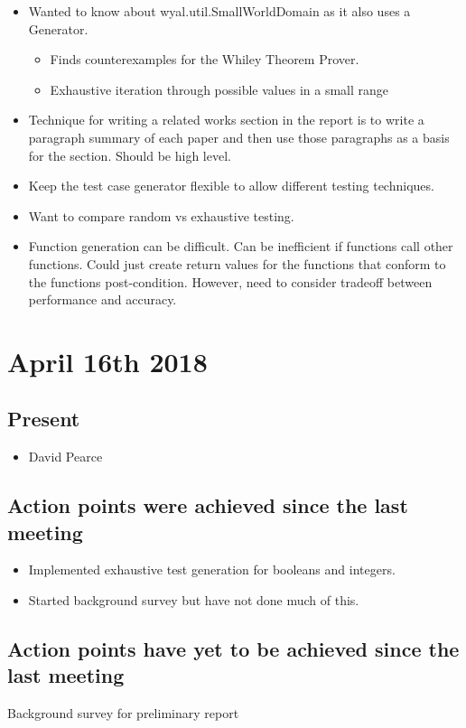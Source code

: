 \documentclass[]{article}
\begin{document}
\begin{itemize}

	\item Wanted to know about wyal.util.SmallWorldDomain as it also uses a Generator.
		\begin{itemize}
			\item Finds counterexamples for the Whiley Theorem Prover.
			\item Exhaustive iteration through possible values in a small range
		\end{itemize}
	\item Technique for writing a related works section in the report is to write a paragraph summary of each paper and then use those paragraphs as a basis for the section. Should be high level.
	\item Keep the test case generator flexible to allow different testing techniques.
	\item Want to compare random vs exhaustive testing.
	\item Function generation can be difficult. Can be inefficient if functions call other functions. Could just create return values for the functions that conform to the functions post-condition. However, need to consider tradeoff between performance and accuracy.
\end{itemize}

\section{April 16th 2018}
\subsection{Present}
\begin{itemize}
	\item David Pearce
\end{itemize}

\subsection{Action points were achieved since the last meeting}
	\begin{itemize}
		\item Implemented exhaustive test generation for booleans and integers.
		\item Started background survey but have not done much of this.
	\end{itemize}

\subsection{Action points have yet to be achieved since the last meeting}
Background survey for preliminary report
\end{document}
